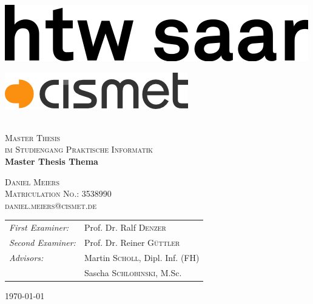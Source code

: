 \begin{titlepage}
\begin{center}

\begin{minipage}[t]{0.4\textwidth}
	\begin{flushleft}
	\includegraphics[width=\textwidth]{img/logo_htw_saar}
	\end{flushleft}
\end{minipage}
\hfill
\begin{minipage}[t]{0.4\textwidth}
	\begin{flushright}
	\includegraphics[width=\textwidth]{img/logo_cismet_grey}
	\end{flushright}
\end{minipage}



~\\[1cm]

\textsc{\LARGE Master Thesis}\\
\textsc{\large im Studiengang Praktische Informatik}\\[1.5cm]
\hspace{0.4cm}
{ \huge \bfseries Master Thesis Thema \\[0.4cm] }

\hspace{1.5cm}

\textsc{\large Daniel Meiers}\\[0.2cm]
\textsc{\large Matriculation No.: 3538990}\\[0.2cm]
\textsc{\large daniel.meiers@cismet.de}\\[4cm]

\begin{tabular}[0.8\textwidth]{l l}
\emph{First Examiner:} & Prof. Dr. Ralf \textsc{Denzer} \\
\emph{Second Examiner:} & Prof. Dr. Reiner \textsc{Güttler} \\
\emph{Advisors:} & Martin \textsc{Scholl}, Dipl. Inf. (FH) \\
 				& Sascha \textsc{Schlobinski}, M.Sc.
\end{tabular}


\vfill

{\large \today}

\end{center}
\end{titlepage}